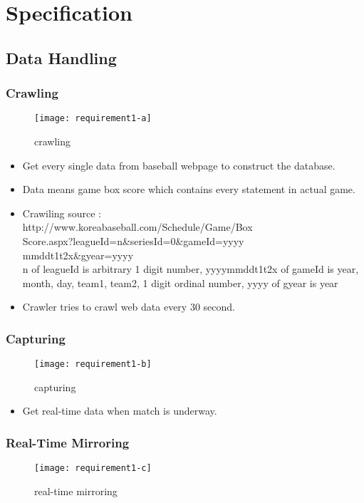 \documentclass[conference,compsoc, twocolumn]{IEEEtran}
\begin{document}
\section{Specification}


\subsection{Data Handling}

\subsubsection{Crawling}
\begin{figure}[h]
\centering\texttt{[image: requirement1-a]}
\caption{crawling}
\end{figure}

\begin{itemize}
\item Get every single data from baseball webpage to construct the database.
\item Data means game box score which contains every statement in actual game.
\item Crawiling source : \\
	http://www.koreabaseball.com/Schedule/Game/Box\\Score.aspx?leagueId=n\&seriesId=0\&gameId=yyyy\\mmddt1t2x\&gyear=yyyy\\
	n of leagueId is arbitrary 1 digit number, yyyymmddt1t2x of gameId is year, month, day, team1, team2, 1 digit ordinal number, yyyy of gyear is year
\item Crawler tries to crawl web data every 30 second.
\end{itemize}


\subsubsection{Capturing}
\begin{figure}[h]
\centering\texttt{[image: requirement1-b]}
\caption{capturing}
\end{figure}

\begin{itemize}
\item Get real-time data when match is underway.
\end{itemize}


\subsubsection{Real-Time Mirroring}
\begin{figure}[h]
\centering\texttt{[image: requirement1-c]}
\caption{real-time mirroring}
\end{figure}
\end{document}
